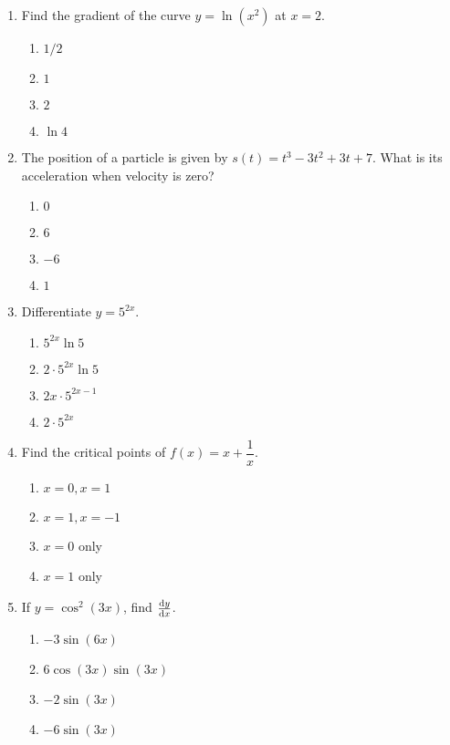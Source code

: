 \begin{multicols}{2}
\begin{enumerate}[label={\arabic*.}]
    \item Find the gradient of the curve \(y = \ln(x^2)\) at \(x=2\).
      \begin{enumerate}[label={\Alph*.}]
        \item \(1/2\)
        \item \(1\)
        \item \(2\)
        \item \(\ln 4\)
      \end{enumerate}
    \item The position of a particle is given by \(s(t) = t^3 - 3t^2 + 3t + 7\). What is its acceleration when velocity is zero?
      \begin{enumerate}[label={\Alph*.}]
        \item \(0\)
        \item \(6\)
        \item \(-6\)
        \item \(1\)
      \end{enumerate}
    \item Differentiate \(y = 5^{2x}\).
      \begin{enumerate}[label={\Alph*.}]
        \item \(5^{2x} \ln 5\)
        \item \(2 \cdot 5^{2x} \ln 5\)
        \item \(2x \cdot 5^{2x-1}\)
        \item \(2 \cdot 5^{2x}\)
      \end{enumerate}
    \item Find the critical points of \(f(x) = x + \dfrac{1}{x}\).
      \begin{enumerate}[label={\Alph*.}]
        \item \(x=0, x=1\)
        \item \(x=1, x=-1\)
        \item \(x=0\) only
        \item \(x=1\) only
      \end{enumerate}
    \item If \(y = \cos^2(3x)\), find \(\frac{\mathrm{d}y}{\mathrm{d}x}\).
      \begin{enumerate}[label={\Alph*.}]
        \item \(-3\sin(6x)\)
        \item \(6\cos(3x)\sin(3x)\)
        \item \(-2\sin(3x)\)
        \item \(-6\sin(3x)\)
      \end{enumerate}

\end{enumerate}
\end{multicols}
